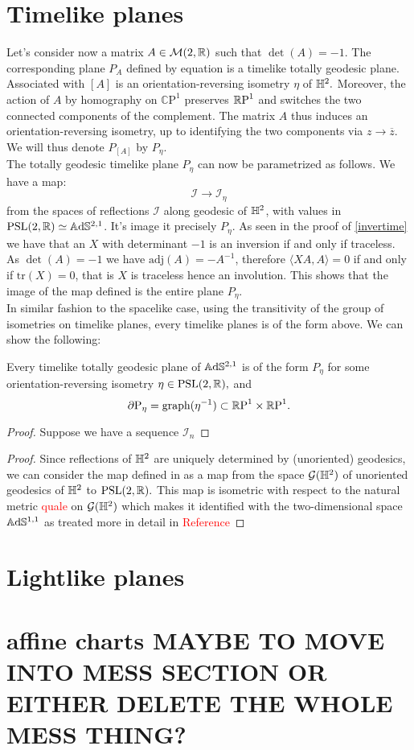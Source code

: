 \section{Timelike planes}
Let's consider now a matrix $A\in\mathcal{M}(2,\R)$ such that $\det(A)=-1.$ The corresponding plane $P_A$ defined by equation  is a timelike totally geodesic plane. Associated with $[A]$ is an orientation-reversing isometry $\eta$ of $\H^2.$ Moreover, the action of $A$ by homography on $\mathbb{C}\text{P}^1$ preserves $\S$ and switches the two connected components of the complement. The matrix $A$ thus induces an orientation-reversing isometry, up to identifying the two components via $z\to\overline{z}$. We will thus denote $P_[A]$ by $P_\eta$. \\
The totally geodesic timelike plane $P_\eta$ can now be parametrized as follows. We have a map: 
\begin{equation}\label{refspa}
    \mathcal{I}\to\mathcal{I}_\eta
\end{equation}
from the spaces of reflections $\mathcal{I}$ along geodesic of $\H^2$, with values in $\PSL\simeq\A^{2,1}$. It's image it precisely $P_\eta.$ As seen in the proof of \ref{invertime} we have that an $X$ with determinant $-1$ is an inversion if and only if traceless. As $\det(A)=-1$ we have $\text{adj}(A)=-A^{-1}$, therefore $\langle XA,A\rangle=0$ if and only if $\text{tr}(X)=0$, that is $X$ is traceless hence an involution. This shows that the image of the map defined  is the entire plane $P_\eta$.\\  
In similar fashion to the spacelike case, using the transitivity of the group of isometries on timelike planes, every timelike planes is of the form above. We can show the following: 
\begin{lemma}
    Every timelike totally geodesic plane of $\A^{2,1}$ is of the form $P_\eta$ for some orientation-reversing isometry $\eta\in\PSL,$ and 
    \[
        \partial\text{P}_\eta=\text{graph}(\eta^{-1})\subset\T.
    \]
\end{lemma}
\begin{proof}
    Suppose we have a sequence $\mathcal{I}_n$
\end{proof}
\begin{proof}
    Since reflections of $\H^2$ are uniquely determined by (unoriented) geodesics, we can consider the map defined in  as a map from the space $\mathcal{G}(\H^2)$ of unoriented geodesics of $\H^2$ to $\PSL.$ This map is isometric with respect to the natural metric \textcolor{red}{quale} on $\mathcal{G}(\H^2)$ which makes it identified with the two-dimensional space $\A^{1,1}$ as treated more in detail in \textcolor{red}{Reference}
    \end{proof}
\section{Lightlike planes}
\section{affine charts MAYBE TO MOVE INTO MESS SECTION OR EITHER DELETE THE WHOLE MESS THING?}
